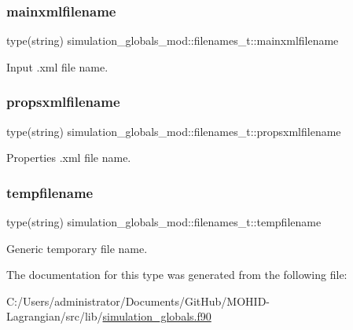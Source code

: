 \subsubsection{\texorpdfstring{mainxmlfilename}{mainxmlfilename}}
{\footnotesize\ttfamily type(string) simulation\+\_\+globals\+\_\+mod\+::filenames\+\_\+t\+::mainxmlfilename\hspace{0.3cm}{\ttfamily [private]}}



Input .xml file name. 

\mbox{\label{structsimulation__globals__mod_1_1filenames__t_ae9790bc76014d831bfad281ab63e6f4c}} 
\subsubsection{\texorpdfstring{propsxmlfilename}{propsxmlfilename}}
{\footnotesize\ttfamily type(string) simulation\+\_\+globals\+\_\+mod\+::filenames\+\_\+t\+::propsxmlfilename\hspace{0.3cm}{\ttfamily [private]}}



Properties .xml file name. 

\mbox{\label{structsimulation__globals__mod_1_1filenames__t_a207bede622cac14f7baef87cf0c000b7}} 
\subsubsection{\texorpdfstring{tempfilename}{tempfilename}}
{\footnotesize\ttfamily type(string) simulation\+\_\+globals\+\_\+mod\+::filenames\+\_\+t\+::tempfilename\hspace{0.3cm}{\ttfamily [private]}}



Generic temporary file name. 



The documentation for this type was generated from the following file\+:\begin{DoxyCompactItemize}
\item 
C\+:/\+Users/administrator/\+Documents/\+Git\+Hub/\+M\+O\+H\+I\+D-\/\+Lagrangian/src/lib/\hyperlink{simulation__globals_8f90}{simulation\+\_\+globals.\+f90}\end{DoxyCompactItemize}
